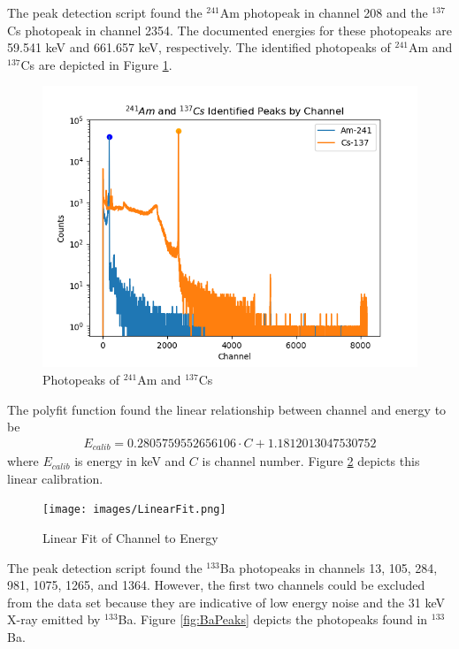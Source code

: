 The peak detection script found the $^{241}$Am photopeak in channel 208 and the $^{137}$Cs photopeak in channel 2354. The documented energies for these photopeaks are 59.541 keV  and 661.657 keV, respectively. The identified photopeaks of $^{241}$Am and $^{137}$Cs are depicted in Figure \ref{fig:Peaks}.

\begin{figure}[H]
\centering
\includegraphics[scale=0.8]{images/Peaks.png}
\caption{Photopeaks of $^{241}$Am and $^{137}$Cs}
\label{fig:Peaks}
\end{figure}

The polyfit function found the linear relationship between channel and energy to be
\begin{align}
E_{calib} = 0.2805759552656106\cdot C + 1.1812013047530752 \label{eq:1}
\end{align}
where $E_{calib}$ is energy in keV and $C$ is channel number. Figure \ref{fig:Fit} depicts this linear calibration.

\begin{figure}[H]
\centering
\texttt{[image: images/LinearFit.png]}
\caption{Linear Fit of Channel to Energy}
\label{fig:Fit}
\end{figure}

The peak detection script found the $^{133}$Ba photopeaks in channels 13, 105, 284, 981, 1075, 1265, and 1364. However, the first two channels could be excluded from the data set because they are indicative of low energy noise and the 31 keV X-ray emitted by $^{133}$Ba. Figure \ref{fig:BaPeaks} depicts the photopeaks found in $^{133}$Ba.

